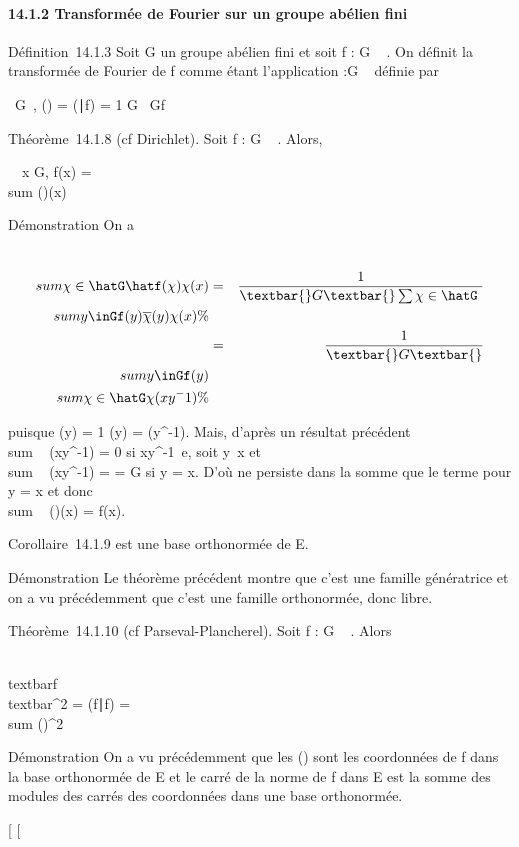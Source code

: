 \paragraph{14.1.2 Transformée de Fourier sur un groupe abélien fini}

Définition~14.1.3 Soit G un groupe abélien fini et soit f : G \rightarrow~ . On
définit la transformée de Fourier de f comme étant l'application
\hatf :\hat G \rightarrow~  définie par

\forall~\chi \in\hat G~,
\hatf(\chi) = (\chi∣f) =
1\over
\textbar{}G\textbar{}\int ~
Gf\overline\chi

Théorème~14.1.8 (cf Dirichlet). Soit f : G \rightarrow~ . Alors,

\forall~~x \in G, f(x) = \\sum
\chi\in\hatG\hatf(\chi)\chi(x)

Démonstration On a

\begin{align*} \\sum
\chi\in\hatG\hatf(\chi)\chi(x)&
=& 1 \over \textbar{}G\textbar{}
\sum \chi\in\hatG~
\\sum
y\inGf(y)\overline\chi(y)\chi(x)\%&
\\ & =& 1 \over
\textbar{}G\textbar{} \\sum
y\inGf(y)\\sum
\chi\in\hatG\chi(xy^-1) \%&
\\ \end{align*}

puisque \overline\chi(y) = 1 \over
\chi(y) = \chi(y^-1). Mais, d'après un résultat précédent
\\sum ~
\chi\in\hatG\chi(xy^-1) = 0 si
xy^-1\neq~e, soit
y\neq~x et
\\sum ~
\chi\in\hatG\chi(xy^-1) =
\textbar{}\hatG\textbar{} = \textbar{}G\textbar{} si
y = x. D'où ne persiste dans la somme que le terme pour y = x et donc
\\sum ~
\chi\in\hatG\hatf(\chi)\chi(x) =
f(x).

Corollaire~14.1.9 \hatG est une base orthonormée de
E.

Démonstration Le théorème précédent montre que c'est une famille
génératrice et on a vu précédemment que c'est une famille orthonormée,
donc libre.

Théorème~14.1.10 (cf Parseval-Plancherel). Soit f : G \rightarrow~ . Alors

\\textbar{}f\\textbar{}^2 =
(f∣f) = \\sum
\chi\in\hatG\textbar{}\hatf(\chi)\textbar{}^2

Démonstration On a vu précédemment que les \hatf(\chi)
sont les coordonnées de f dans la base orthonormée
\hatG de E et le carré de la norme de f dans E est la
somme des modules des carrés des coordonnées dans une base orthonormée.

{[}
{[}

